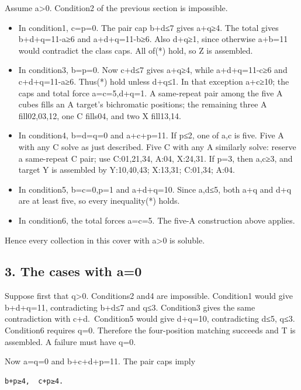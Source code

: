 \documentclass[
  10pt,
]{article}
\providecommand{\tightlist}{%
  \setlength{\itemsep}{0pt}\setlength{\parskip}{0pt}}
\begin{document}
Assume a\textgreater0. Condition2 of the previous section is impossible.

\begin{itemize}
\tightlist
\item
  In condition1, c=p=0. The pair cap b+d≤7 gives a+q≥4. The total gives
  b+d+q=11-a≥6 and a+d+q=11-b≥6. Also d+q≥1, since otherwise a+b=11
  would contradict the class caps. All of(*) hold, so Z is assembled.
\item
  In condition3, b=p=0. Now c+d≤7 gives a+q≥4, while a+d+q=11-c≥6 and
  c+d+q=11-a≥6. Thus(*) hold unless d+q≤1. In that exception a+c≥10; the
  caps and total force a=c=5,d+q=1. A same-repeat pair among the five A
  cubes fills an A target's bichromatic positions; the remaining three A
  fill02,03,12, one C fills04, and two X fill13,14.
\item
  In condition4, b=d=q=0 and a+c+p=11. If p≤2, one of a,c is five. Five
  A with any C solve as just described. Five C with any A similarly
  solve: reserve a same-repeat C pair; use C:01,21,34, A:04, X:24,31. If
  p=3, then a,c≥3, and target Y is assembled by Y:10,40,43; X:13,31;
  C:01,34; A:04.
\item
  In condition5, b=c=0,p=1 and a+d+q=10. Since a,d≤5, both a+q and d+q
  are at least five, so every inequality(*) holds.
\item
  In condition6, the total forces a=c=5. The five-A construction above
  applies.
\end{itemize}

Hence every collection in this cover with a\textgreater0 is soluble.

\hypertarget{the-cases-with-a0}{%
\subsection*{3. The cases with a=0}\label{the-cases-with-a0}}

Suppose first that q\textgreater0. Conditions2 and4 are impossible.
Condition1 would give b+d+q=11, contradicting b+d≤7 and q≤3. Condition3
gives the same contradiction with c+d.~Condition5 would give d+q=10,
contradicting d≤5, q≤3. Condition6 requires q=0. Therefore the
four-position matching succeeds and T is assembled. A failure must have
q=0.

Now a=q=0 and b+c+d+p=11. The pair caps imply

\begin{verbatim}
b+p≥4,  c+p≥4.
\end{verbatim}
\end{document}
